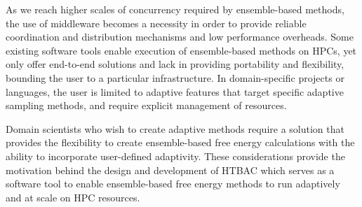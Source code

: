 As we reach higher scales of concurrency required by ensemble-based methods,
the use of middleware becomes a necessity in order to provide reliable
coordination and distribution mechanisms and low performance overheads. Some
existing software tools enable execution of ensemble-based methods on HPCs,
yet only offer end-to-end solutions and lack in providing portability and
flexibility, bounding the user to a particular infrastructure. In
domain-specific projects or languages, the user is limited to
adaptive features that target specific adaptive sampling methods, and require
explicit management of resources.

Domain scientists who wish to create adaptive methods require a solution that
provides the flexibility to create ensemble-based free energy
calculations with the ability to incorporate user-defined adaptivity. These
considerations provide the motivation behind the design and development of
HTBAC which serves as a software tool to enable ensemble-based free energy
methods to run adaptively and at scale on HPC resources.



